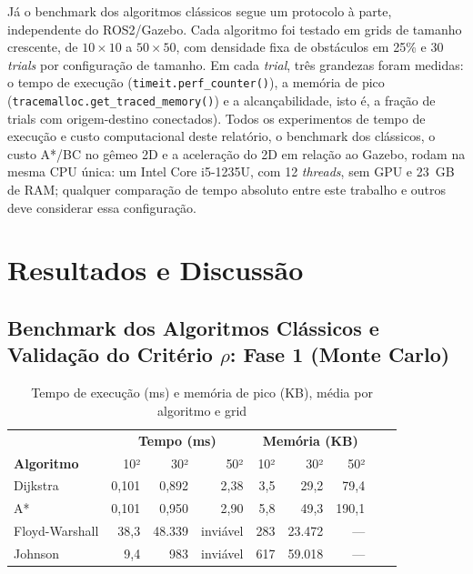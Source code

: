 \documentclass[12pt, a4paper]{article}
\begin{document}
Já o benchmark dos algoritmos clássicos segue um protocolo à parte, independente do ROS2/Gazebo.
Cada algoritmo foi testado em grids de tamanho crescente, de $10\times10$ a $50\times50$, com
densidade fixa de obstáculos em 25\% e 30 \textit{trials} por configuração de tamanho. Em cada
\textit{trial}, três grandezas foram medidas: o tempo de execução
(\texttt{timeit.perf\_counter()}), a memória de pico
(\texttt{tracemalloc.get\_traced\_memory()}) e a alcançabilidade, isto é, a fração de trials com
origem-destino conectados). Todos os experimentos de tempo de execução e custo computacional
deste relatório, o benchmark dos clássicos, o custo A*/BC no gêmeo 2D e a aceleração do 2D em
relação ao Gazebo, rodam na mesma CPU única: um Intel Core i5-1235U, com 12 \textit{threads}, sem
GPU e 23~GB de RAM; qualquer comparação de tempo absoluto entre este trabalho e outros deve
considerar essa configuração.

\section{Resultados e Discussão}

\subsection{Benchmark dos Algoritmos Clássicos e Validação do Critério \texorpdfstring{$\rho$}{rho}: Fase 1 (Monte Carlo)}
\label{sec:benchmark_classicos}
\label{sec:validacao_fase1}

\begin{table}[H]
  \centering
  \caption{Tempo de execução (ms) e memória de pico (KB), média por algoritmo e grid}
  \label{tab:tempo_memoria}
  \begin{tabular}{lrrrrrrrr}
    \toprule
    & \multicolumn{3}{c}{\textbf{Tempo (ms)}} & \multicolumn{3}{c}{\textbf{Memória (KB)}} \\
    \textbf{Algoritmo} & 10² & 30² & 50² & 10² & 30² & 50² \\
    \midrule
    Dijkstra        & 0,101 & 0,892 & 2,38     & 3,5 & 29,2 & 79,4 \\
    A*              & 0,101 & 0,950 & 2,90     & 5,8 & 49,3 & 190,1 \\
    Floyd-Warshall  & 38,3  & 48.339 & inviável & 283 & 23.472 & --- \\
    Johnson         & 9,4   & 983   & inviável  & 617 & 59.018 & --- \\
    \bottomrule
  \end{tabular}
\end{table}
\end{document}
